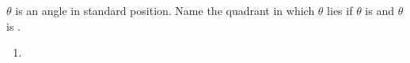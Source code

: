 $\theta$ is an angle in standard position. Name the quadrant in which $\theta$ lies if $\theta$ is  and $\theta$ is .

\begin{enumerate}
    \item
\end{enumerate}